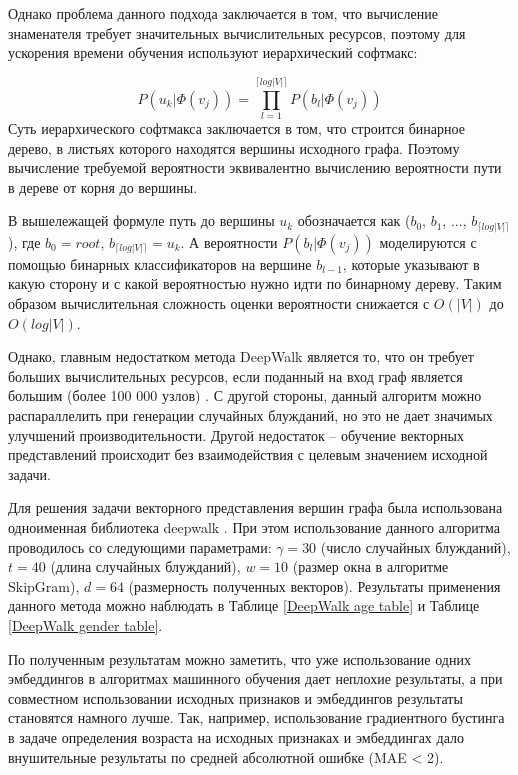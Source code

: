Однако проблема данного подхода заключается в том, что вычисление знаменателя требует значительных вычислительных ресурсов, поэтому для ускорения времени обучения используют иерархический софтмакс:

$$P(u_k | \Phi(v_j)) = \prod_{l=1}^{\lceil log|V| \rceil} P(b_l | \Phi(v_j))$$
Суть иерархического софтмакса заключается в том, что строится бинарное дерево, в листьях которого находятся вершины исходного графа. Поэтому вычисление требуемой вероятности эквивалентно вычислению вероятности пути в дереве от корня до вершины. 

В вышележащей формуле путь до вершины $u_k$ обозначается как ($b_0$, $b_1$, $...$, $b_{\lceil log|V| \rceil}$), где $b_0 = root$, $b_{\lceil log|V| \rceil} = u_k$. А вероятности $P(b_l | \Phi(v_j))$ моделируются с помощью бинарных классификаторов на вершине $b_{l-1}$, которые указывают в какую сторону и с какой вероятностью нужно идти по бинарному дереву. Таким образом вычислительная сложность оценки вероятности снижается с $O(|V |)$ до $O(log |V |)$.

Однако, главным недостатком метода DeepWalk является то, что он требует больших вычислительных ресурсов, если поданный на вход граф является большим (более 100 000 узлов) . С другой стороны, данный алгоритм можно распараллелить при генерации случайных блужданий, но это не дает значимых улучшений производительности. Другой недостаток -- обучение векторных представлений происходит без взаимодействия с целевым значением исходной задачи. 

Для решения задачи векторного представления вершин графа была использована одноименная библиотека deepwalk \cite{deepwalk lib}. При этом использование данного алгоритма проводилось со следующими параметрами:  $\gamma = 30$ (число случайных блужданий), $t = 40$ (длина случайных блужданий), $w = 10$ (размер окна в алгоритме SkipGram), $d = 64$ (размерность полученных векторов). Результаты применения данного метода можно наблюдать в Таблице \ref{DeepWalk age table} и Таблице \ref{DeepWalk gender table}. 

По полученным результатам можно заметить, что уже использование одних эмбеддингов в алгоритмах машинного обучения дает неплохие результаты, а при совместном использовании исходных признаков и эмбеддингов результаты становятся намного лучше. Так, например, использование градиентного бустинга в задаче определения возраста на исходных признаках и эмбеддингах дало внушительные  результаты по средней абсолютной ошибке (MAE < 2).  


